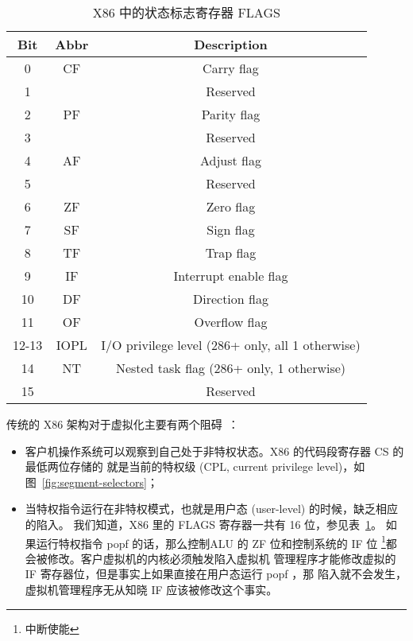 \begin{table}[h]
    \centering
    \caption{X86 中的状态标志寄存器 FLAGS}
    \begin{tabular}{||c c c||}
        \hline
        Bit & Abbr & Description \\
        \hline
        \hline
        0 & CF & Carry flag \\
        1 &  & Reserved \\
        2 & PF & Parity flag \\
        3 &  & Reserved \\
        4 & AF & Adjust flag \\
        5 &  & Reserved \\
        6 & ZF & Zero flag \\
        7 & SF & Sign flag \\
        8 & TF & Trap flag \\
        9 & IF & Interrupt enable flag \\
        10 & DF & Direction flag \\
        11 & OF & Overflow flag \\
        12-13 & IOPL & I/O privilege level (286+ only, all 1 otherwise) \\
        14 & NT & Nested task flag (286+ only, 1 otherwise) \\
        15 &  & Reserved \\
        \hline
    \end{tabular}
    \label{table:flags-x86}
\end{table}

传统的 X86 架构对于虚拟化主要有两个阻碍~\cite{adams2006comparison}：

\begin{itemize}
    \item 客户机操作系统可以观察到自己处于非特权状态。X86 的代码段寄存器 CS 的最低两位存储的
    就是当前的特权级 (CPL, current privilege level)，如图~\ref{fig:segment-selectors}；
    \item 当特权指令运行在非特权模式，也就是用户态 (user-level) 的时候，缺乏相应的陷入。
    我们知道，X86 里的 FLAGS 寄存器一共有 16 位，参见表~\ref{table:flags-x86}。
    如果运行特权指令 popf 的话，那么控制ALU 的 ZF 位和控制系统的 IF 位
    \footnote{中断使能}都会被修改。客户虚拟机的内核必须触发陷入虚拟机
    管理程序才能修改虚拟的 IF 寄存器位，但是事实上如果直接在用户态运行 popf ，那
    陷入就不会发生，虚拟机管理程序无从知晓 IF 应该被修改这个事实。
\end{itemize}

